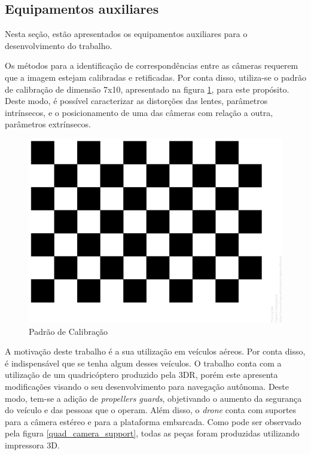 \subsection{Equipamentos auxiliares}

Nesta seção, estão apresentados os equipamentos auxiliares para o desenvolvimento do trabalho. 

Os métodos para a identificação de correspondências entre as câmeras requerem que a imagem estejam calibradas e retificadas. Por conta disso, utiliza-se o padrão de calibração de dimensão 7x10, apresentado na figura \ref{calibration_pattern}, para este propósito. Deste modo, é possível caracterizar as distorções das lentes, parâmetros intrínsecos, e o posicionamento de uma das câmeras com relação a outra, parâmetros extrínsecos.  

\begin{figure}[H]
	\centering
	\includegraphics[scale=0.10]{./Resources/calibration_pattern.png}
	\caption{Padrão de Calibração}
	\label{calibration_pattern}
\end{figure}

A motivação deste trabalho é a sua utilização em veículos aéreos. Por conta disso, é indispensável que se tenha algum desses veículos. O trabalho conta com a utilização de um quadricóptero produzido pela 3DR, porém este apresenta modificações visando o seu desenvolvimento para navegação autônoma. Deste modo, tem-se a adição de \textit{propellers guards}, objetivando o aumento da segurança do veículo e das pessoas que o operam. Além disso, o \textit{drone} conta com suportes para a câmera estéreo e para a plataforma embarcada. Como pode ser observado pela figura \ref{quad_camera_support}, todas as peças foram produzidas utilizando impressora 3D.

